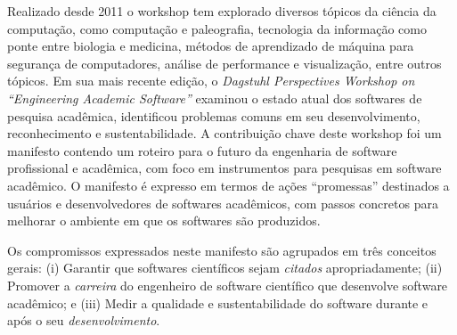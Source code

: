 Realizado desde 2011 o workshop tem explorado diversos tópicos da ciência da
computação, como computação e paleografia, tecnologia da informação como ponte
entre biologia e medicina, métodos de aprendizado de máquina para segurança de
computadores, análise de performance e visualização, entre outros tópicos. Em
sua mais recente edição, o {\it Dagstuhl Perspectives Workshop on ``Engineering
Academic Software''} \cite{allen2017engineering} examinou o estado atual dos
softwares de pesquisa acadêmica, identificou problemas comuns em seu
desenvolvimento, reconhecimento e sustentabilidade. A contribuição chave deste
workshop foi um manifesto contendo um roteiro para o futuro da engenharia de
software profissional e acadêmica, com foco em instrumentos para pesquisas em
software acadêmico. O manifesto é expresso em termos de ações ``promessas''
destinados a usuários e desenvolvedores de softwares acadêmicos, com passos
concretos para melhorar o ambiente em que os softwares são produzidos.

Os compromissos expressados neste manifesto são agrupados em três conceitos gerais:
(i) Garantir que softwares científicos sejam {\it citados} apropriadamente;
(ii) Promover a {\it carreira} do engenheiro de software científico que desenvolve software acadêmico; e
(iii) Medir a qualidade e sustentabilidade do software durante e após o seu {\it desenvolvimento}.



